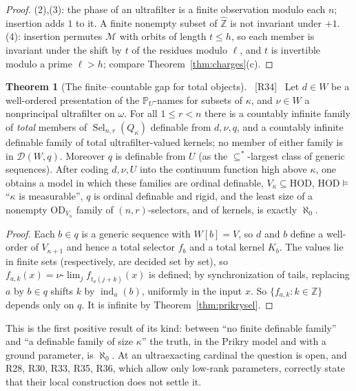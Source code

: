 \documentclass[11pt,letterpaper]{article}
\theoremstyle{definition}
\newtheorem{theorem}[definition]{Theorem}
\numberwithin{equation}{section}
\newcommand{\HOD}{\mathrm{HOD}}
\newcommand{\OD}{\mathrm{OD}}
\newcommand{\Sel}{\operatorname{Sel}}
\newcommand{\PP}{\mathbb P}
\newcommand{\ch}{\operatorname{ind}}
\newcommand{\src}[1]{\unskip\ {\normalfont\small\sffamily\color{Olive}[#1]}\ }
\newcommand{\R}[1]{\textsf{R#1}}
\begin{document}
\begin{proof}
(2),(3): the phase of an ultrafilter is a finite observation modulo each $n$; insertion adds $1$ to it. A finite nonempty subset of $\widehat{\mathbb Z}$ is not invariant under $+1$. (4): insertion permutes $\mathcal M$ with orbits of length $t\le h$, so each member is invariant under the shift by $t$ of the residues modulo $\ell$, and $t$ is invertible modulo a prime $\ell>h$; compare Theorem~\ref{thm:charges}(c).
\end{proof}

\begin{theorem}[The finite--countable gap for total objects]\label{thm:gap}\src{R34}
Let $d\in W$ be a well-ordered presentation of the $\PP_U$-names for subsets of $\kappa$, and $\nu\in W$ a nonprincipal ultrafilter on $\omega$. For all $1\le r<n$ there is a countably infinite family of \emph{total} members of $\Sel_{n,r}(Q_\kappa)$ definable from $d,\nu,q$, and a countably infinite definable family of total ultrafilter-valued kernels; no member of either family is in $\mathcal D(W,q)$. Moreover $q$ is definable from $U$ (as the $\subseteq^*$-largest class of generic sequences). After coding $d,\nu,U$ into the continuum function high above $\kappa$, one obtains a model in which these families are ordinal definable, $V_\kappa\subseteq\HOD$, $\HOD\models$ ``$\kappa$ is measurable'', $q$ is ordinal definable and rigid, and the least size of a nonempty $\OD_{V_\kappa}$ family of $(n,r)$-selectors, and of kernels, is exactly $\aleph_0$.
\end{theorem}

\begin{proof}
Each $b\in q$ is a generic sequence with $W[b]=V$, so $d$ and $b$ define a well-order of $V_{\kappa+1}$ and hence a total selector $f_b$ and a total kernel $K_b$. The values lie in finite sets (respectively, are decided set by set), so $f_{a,k}(x)=\nu\text{-}\lim_j f_{t_a(j+k)}(x)$ is defined; by synchronization of tails, replacing $a$ by $b\in q$ shifts $k$ by $\ch_a(b)$, uniformly in the input $x$. So $\{f_{a,k}:k\in\mathbb Z\}$ depends only on $q$. It is infinite by Theorem~\ref{thm:prikrysel}.
\end{proof}

This is the first positive result of its kind: between ``no finite definable family'' and ``a definable family of size $\kappa$'' the truth, in the Prikry model and with a ground parameter, is $\aleph_0$. At an ultraexacting cardinal the question is open, and \R{28}, \R{30}, \R{33}, \R{35}, \R{36}, which allow only low-rank parameters, correctly state that their local construction does not settle it.
\end{document}
